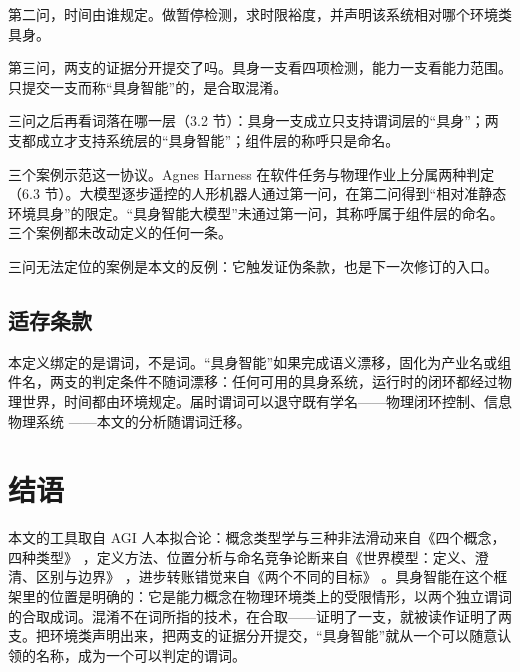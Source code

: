 \documentclass[10pt,fontset=fandol]{ctexart}
\begin{document}
第二问，时间由谁规定。做暂停检测，求时限裕度，并声明该系统相对哪个环境类具身。

第三问，两支的证据分开提交了吗。具身一支看四项检测，能力一支看能力范围。只提交一支而称“具身智能”的，是合取混淆。

三问之后再看词落在哪一层（3.2 节）：具身一支成立只支持谓词层的“具身”；两支都成立才支持系统层的“具身智能”；组件层的称呼只是命名。

三个案例示范这一协议。Agnes Harness 在软件任务与物理作业上分属两种判定（6.3 节）。大模型逐步遥控的人形机器人通过第一问，在第二问得到“相对准静态环境具身”的限定。“具身智能大模型”未通过第一问，其称呼属于组件层的命名。三个案例都未改动定义的任何一条。

三问无法定位的案例是本文的反例：它触发证伪条款，也是下一次修订的入口。

\subsection{适存条款}

本定义绑定的是谓词，不是词。“具身智能”如果完成语义漂移，固化为产业名或组件名，两支的判定条件不随词漂移：任何可用的具身系统，运行时的闭环都经过物理世界，时间都由环境规定。届时谓词可以退守既有学名——物理闭环控制、信息物理系统 \cite{lee2008}——本文的分析随谓词迁移。

\section{结语}\label{sec:closing}
本文的工具取自 AGI 人本拟合论：概念类型学与三种非法滑动来自《四个概念，四种类型》 \cite{yu2026four}，定义方法、位置分析与命名竞争论断来自《世界模型：定义、澄清、区别与边界》 \cite{yu2026wm}，进步转账错觉来自《两个不同的目标》 \cite{yu2026two}。具身智能在这个框架里的位置是明确的：它是能力概念在物理环境类上的受限情形，以两个独立谓词的合取成词。混淆不在词所指的技术，在合取——证明了一支，就被读作证明了两支。把环境类声明出来，把两支的证据分开提交，“具身智能”就从一个可以随意认领的名称，成为一个可以判定的谓词。
\end{document}
